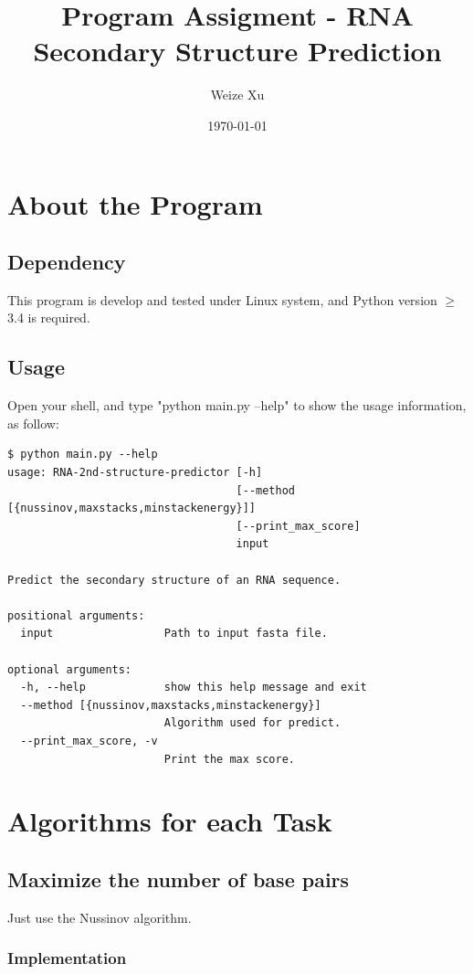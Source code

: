 \documentclass[10pt]{article}
\title{Program Assigment - RNA Secondary Structure Prediction}
\date{\today}
\author{Weize Xu}
\begin{document}
\maketitle

\section{About the Program}

\subsection{Dependency}
This program is develop and tested under Linux system,
and Python version $\geq$ 3.4 is required.

\subsection{Usage}

Open your shell, and type "python main.py --help" to show the usage information, as follow:

\begin{lstlisting}[frame=single]
$ python main.py --help
usage: RNA-2nd-structure-predictor [-h]
                                   [--method [{nussinov,maxstacks,minstackenergy}]]
                                   [--print_max_score]
                                   input

Predict the secondary structure of an RNA sequence.

positional arguments:
  input                 Path to input fasta file.

optional arguments:
  -h, --help            show this help message and exit
  --method [{nussinov,maxstacks,minstackenergy}]
                        Algorithm used for predict.
  --print_max_score, -v
                        Print the max score.
\end{lstlisting}

\section{Algorithms for each Task}

\subsection{Maximize the number of base pairs}
Just use the Nussinov algorithm.

\subsubsection{Implementation}
\end{document}
